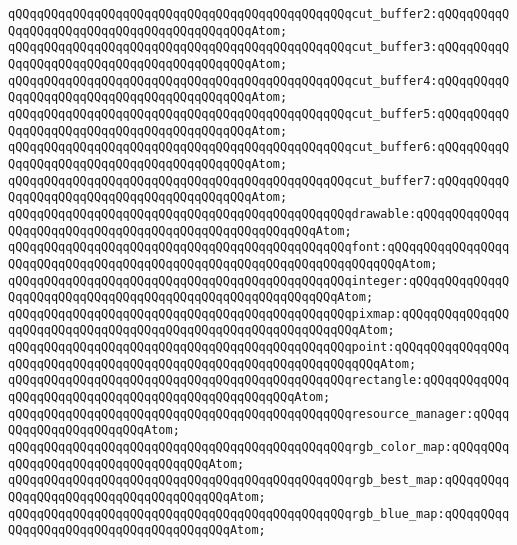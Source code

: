 \verb|qQQqqQQqqQQqqQQqqQQqqQQqqQQqqQQqqQQqqQQqqQQqqQQqcut_buffer2:qQQqqQQqqQQqqQQqqQQqqQQqqQQqqQQqqQQqqQQqqQQqAtom;|\newline
\verb|qQQqqQQqqQQqqQQqqQQqqQQqqQQqqQQqqQQqqQQqqQQqqQQqcut_buffer3:qQQqqQQqqQQqqQQqqQQqqQQqqQQqqQQqqQQqqQQqqQQqAtom;|\newline
\verb|qQQqqQQqqQQqqQQqqQQqqQQqqQQqqQQqqQQqqQQqqQQqqQQqcut_buffer4:qQQqqQQqqQQqqQQqqQQqqQQqqQQqqQQqqQQqqQQqqQQqAtom;|\newline
\verb|qQQqqQQqqQQqqQQqqQQqqQQqqQQqqQQqqQQqqQQqqQQqqQQqcut_buffer5:qQQqqQQqqQQqqQQqqQQqqQQqqQQqqQQqqQQqqQQqqQQqAtom;|\newline
\verb|qQQqqQQqqQQqqQQqqQQqqQQqqQQqqQQqqQQqqQQqqQQqqQQqcut_buffer6:qQQqqQQqqQQqqQQqqQQqqQQqqQQqqQQqqQQqqQQqqQQqAtom;|\newline
\verb|qQQqqQQqqQQqqQQqqQQqqQQqqQQqqQQqqQQqqQQqqQQqqQQqcut_buffer7:qQQqqQQqqQQqqQQqqQQqqQQqqQQqqQQqqQQqqQQqqQQqAtom;|\newline
\verb|qQQqqQQqqQQqqQQqqQQqqQQqqQQqqQQqqQQqqQQqqQQqqQQqdrawable:qQQqqQQqqQQqqQQqqQQqqQQqqQQqqQQqqQQqqQQqqQQqqQQqqQQqqQQqAtom;|\newline
\verb|qQQqqQQqqQQqqQQqqQQqqQQqqQQqqQQqqQQqqQQqqQQqqQQqfont:qQQqqQQqqQQqqQQqqQQqqQQqqQQqqQQqqQQqqQQqqQQqqQQqqQQqqQQqqQQqqQQqqQQqqQQqAtom;|\newline
\verb|qQQqqQQqqQQqqQQqqQQqqQQqqQQqqQQqqQQqqQQqqQQqqQQqinteger:qQQqqQQqqQQqqQQqqQQqqQQqqQQqqQQqqQQqqQQqqQQqqQQqqQQqqQQqqQQqAtom;|\newline
\verb|qQQqqQQqqQQqqQQqqQQqqQQqqQQqqQQqqQQqqQQqqQQqqQQqpixmap:qQQqqQQqqQQqqQQqqQQqqQQqqQQqqQQqqQQqqQQqqQQqqQQqqQQqqQQqqQQqqQQqAtom;|\newline
\verb|qQQqqQQqqQQqqQQqqQQqqQQqqQQqqQQqqQQqqQQqqQQqqQQqpoint:qQQqqQQqqQQqqQQqqQQqqQQqqQQqqQQqqQQqqQQqqQQqqQQqqQQqqQQqqQQqqQQqqQQqAtom;|\newline
\verb|qQQqqQQqqQQqqQQqqQQqqQQqqQQqqQQqqQQqqQQqqQQqqQQqrectangle:qQQqqQQqqQQqqQQqqQQqqQQqqQQqqQQqqQQqqQQqqQQqqQQqqQQqAtom;|\newline
\verb|qQQqqQQqqQQqqQQqqQQqqQQqqQQqqQQqqQQqqQQqqQQqqQQqresource_manager:qQQqqQQqqQQqqQQqqQQqqQQqAtom;|\newline
\verb|qQQqqQQqqQQqqQQqqQQqqQQqqQQqqQQqqQQqqQQqqQQqqQQqrgb_color_map:qQQqqQQqqQQqqQQqqQQqqQQqqQQqqQQqqQQqAtom;|\newline
\verb|qQQqqQQqqQQqqQQqqQQqqQQqqQQqqQQqqQQqqQQqqQQqqQQqrgb_best_map:qQQqqQQqqQQqqQQqqQQqqQQqqQQqqQQqqQQqqQQqAtom;|\newline
\verb|qQQqqQQqqQQqqQQqqQQqqQQqqQQqqQQqqQQqqQQqqQQqqQQqrgb_blue_map:qQQqqQQqqQQqqQQqqQQqqQQqqQQqqQQqqQQqqQQqAtom;|\newline
